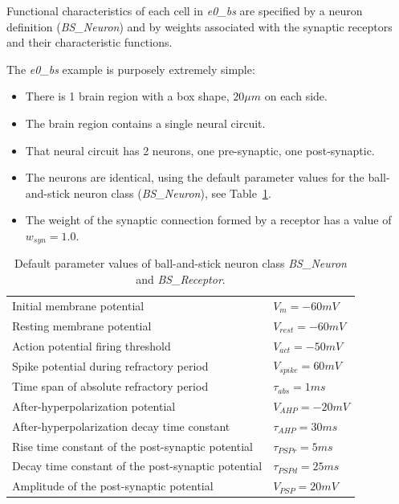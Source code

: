 \documentclass{ldr-article}
\def\firstexp{\textit{e0\_bs} }
\begin{document}
Functional characteristics of each cell in \firstexp are specified by a neuron definition (\textit{BS\_Neuron}) and by weights associated with the synaptic receptors and their characteristic functions.

The \firstexp example is purposely extremely simple:
\begin{itemize}
	\item There is 1 brain region with a box shape, $20 \mu m$ on each side.
	\item The brain region contains a single neural circuit.
	\item That neural circuit has 2 neurons, one pre-synaptic, one post-synaptic.
	\item The neurons are identical, using the default parameter values for the ball-and-stick neuron class (\textit{BS\_Neuron}), see Table~\ref{tab:bs_neuron_default_pars}.
	\item The weight of the synaptic connection formed by a receptor has a value of $w_{syn} = 1.0$.
\end{itemize}

\begin{table}
	\begin{tabular}{ll}
		\centering
		Initial membrane potential & $V_m = -60 mV$ \\
		Resting membrane potential & $V_{rest} = -60 mV$ \\
		Action potential firing threshold & $V_{act} = -50 mV$ \\
		Spike potential during refractory period & $V_{spike} = 60 mV$ \\
		Time span of absolute refractory period & $\tau_{abs} = 1 ms$ \\
		After-hyperpolarization potential & $V_{AHP} = -20 mV$ \\
		After-hyperpolarization decay time constant & $\tau_{AHP} = 30 ms$ \\
		\hline
		Rise time constant of the post-synaptic potential & $\tau_{PSPr} = 5 ms$ \\
		Decay time constant of the post-synaptic potential & $\tau_{PSPd} = 25 ms$ \\
		Amplitude of the post-synaptic potential & $V_{PSP} = 20 mV$ \\
	\end{tabular}
	\caption{Default parameter values of ball-and-stick neuron class \textit{BS\_Neuron} and \textit{BS\_Receptor}.\label{tab:bs_neuron_default_pars}}
\end{table}
\end{document}
